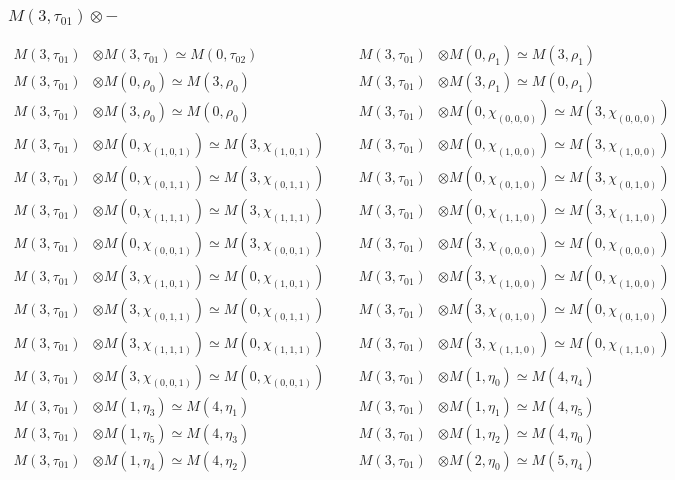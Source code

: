 \subsubsection{$ M(3,\tau_{01})\otimes -$}
\begin{align*}
M(3,\tau_{01}) &\otimes M(3,\tau_{01}) \simeq M(0,\tau_{02}) &&& M(3,\tau_{01}) &\otimes M(0,\rho_{1}) \simeq M(3,\rho_{1})\\
M(3,\tau_{01}) &\otimes M(0,\rho_{0}) \simeq M(3,\rho_{0}) &&& M(3,\tau_{01}) &\otimes M(3,\rho_{1}) \simeq M(0,\rho_{1})\\
M(3,\tau_{01}) &\otimes M(3,\rho_{0}) \simeq M(0,\rho_{0}) &&& M(3,\tau_{01}) &\otimes M(0,\chi_{(0,0,0)}) \simeq M(3,\chi_{(0,0,0)})\\
M(3,\tau_{01}) &\otimes M(0,\chi_{(1,0,1)}) \simeq M(3,\chi_{(1,0,1)}) &&& M(3,\tau_{01}) &\otimes M(0,\chi_{(1,0,0)}) \simeq M(3,\chi_{(1,0,0)})\\
M(3,\tau_{01}) &\otimes M(0,\chi_{(0,1,1)}) \simeq M(3,\chi_{(0,1,1)}) &&& M(3,\tau_{01}) &\otimes M(0,\chi_{(0,1,0)}) \simeq M(3,\chi_{(0,1,0)})\\
M(3,\tau_{01}) &\otimes M(0,\chi_{(1,1,1)}) \simeq M(3,\chi_{(1,1,1)}) &&& M(3,\tau_{01}) &\otimes M(0,\chi_{(1,1,0)}) \simeq M(3,\chi_{(1,1,0)})\\
M(3,\tau_{01}) &\otimes M(0,\chi_{(0,0,1)}) \simeq M(3,\chi_{(0,0,1)}) &&& M(3,\tau_{01}) &\otimes M(3,\chi_{(0,0,0)}) \simeq M(0,\chi_{(0,0,0)})\\
M(3,\tau_{01}) &\otimes M(3,\chi_{(1,0,1)}) \simeq M(0,\chi_{(1,0,1)}) &&& M(3,\tau_{01}) &\otimes M(3,\chi_{(1,0,0)}) \simeq M(0,\chi_{(1,0,0)})\\
M(3,\tau_{01}) &\otimes M(3,\chi_{(0,1,1)}) \simeq M(0,\chi_{(0,1,1)}) &&& M(3,\tau_{01}) &\otimes M(3,\chi_{(0,1,0)}) \simeq M(0,\chi_{(0,1,0)})\\
M(3,\tau_{01}) &\otimes M(3,\chi_{(1,1,1)}) \simeq M(0,\chi_{(1,1,1)}) &&& M(3,\tau_{01}) &\otimes M(3,\chi_{(1,1,0)}) \simeq M(0,\chi_{(1,1,0)})\\
M(3,\tau_{01}) &\otimes M(3,\chi_{(0,0,1)}) \simeq M(0,\chi_{(0,0,1)}) &&& M(3,\tau_{01}) &\otimes M(1,\eta_{0}) \simeq M(4,\eta_{4})\\
M(3,\tau_{01}) &\otimes M(1,\eta_{3}) \simeq M(4,\eta_{1}) &&& M(3,\tau_{01}) &\otimes M(1,\eta_{1}) \simeq M(4,\eta_{5})\\
M(3,\tau_{01}) &\otimes M(1,\eta_{5}) \simeq M(4,\eta_{3}) &&& M(3,\tau_{01}) &\otimes M(1,\eta_{2}) \simeq M(4,\eta_{0})\\
M(3,\tau_{01}) &\otimes M(1,\eta_{4}) \simeq M(4,\eta_{2}) &&& M(3,\tau_{01}) &\otimes M(2,\eta_{0}) \simeq M(5,\eta_{4})\\

\end{align*}
